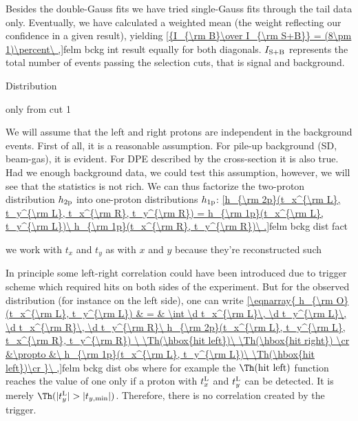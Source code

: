 Besides the double-Gauss fits we have tried single-Gauss fits through the tail data only. Eventually, we have calculated a weighted mean (the weight reflecting our confidence in a given result), yielding
\eqref{{I_{\rm B}\over I_{\rm S+B}} = (8\pm 1)\percent\ ,}{felm bckg int result}
equally for both diagonals. $I_{\rm S+B}$ represents the total number of events passing the selection cuts, that is signal and background.


\caption{Distribution}

\> only from cut 1

We will assume that the left and right protons are independent in the background events. First of all, it is a reasonable assumption. For pile-up background (SD, beam-gas), it is evident. For DPE described by the cross-section  it is also true. Had we enough background data, we could test this assumption, however, we will see that the statistics is not rich. We can thus factorize the two-proton distribution $h_{\rm 2p}$ into one-proton distributions $h_{\rm 1p}$:
\eqref{h_{\rm 2p}(t_x^{\rm L}, t_y^{\rm L}, t_x^{\rm R}, t_y^{\rm R}) = h_{\rm 1p}(t_x^{\rm L}, t_y^{\rm L})\ h_{\rm 1p}(t_x^{\rm R}, t_y^{\rm R})\ .}{felm bckg dist fact}

\> we work with $t_x$ and $t_y$ as with $x$ and $y$ because they're reconstructed such

In principle some left-right correlation could have been introduced due to trigger scheme which required hits on both sides of the experiment. But for the observed distribution (for instance on the left side), one can write
\eqref{\eqnarray{
h_{\rm O}(t_x^{\rm L}, t_y^{\rm L}) & = &
\int \d t_x^{\rm L}\, \d t_y^{\rm L}\, \d t_x^{\rm R}\, \d t_y^{\rm R}\ h_{\rm 2p}(t_x^{\rm L}, t_y^{\rm L}, t_x^{\rm R}, t_y^{\rm R})
	\ \Th(\hbox{hit left})\ \Th(\hbox{hit right})
\cr
&\propto &\ h_{\rm 1p}(t_x^{\rm L}, t_y^{\rm L})\ \Th(\hbox{hit left})\cr
}\ ,}{felm bckg dist obs}
where for example the $\Th(\hbox{hit left})$ function reaches the value of one only if a proton with $t_x^{\rm L}$ and $t_y^{\rm L}$ can be detected. It is merely $\Th(|t_y^{\rm L}| > |t_{y, \rm min}|)$. Therefore, there is no correlation created by the trigger.

\bmfig
{}
\emfig

